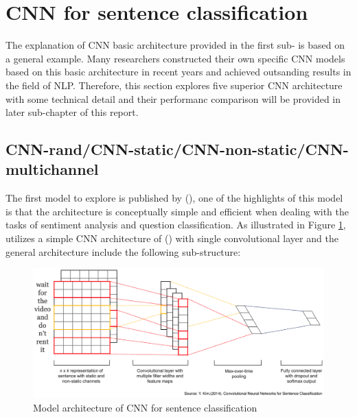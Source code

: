 \documentclass[]{krantz}
\begin{document}
\hypertarget{cnn-for-sentence-classification}{%
\section{CNN for sentence classification}\label{cnn-for-sentence-classification}}

The explanation of CNN basic architecture provided in the first sub-
is based on a general example. Many researchers constructed their own specific CNN models based on this basic architecture in recent years and achieved outsanding results in the field of NLP. Therefore, this section explores five superior CNN architecture with some technical detail and their performanc comparison will be provided in later sub-chapter of this report.

\hypertarget{cnn-randcnn-staticcnn-non-staticcnn-multichannel}{%
\subsection{CNN-rand/CNN-static/CNN-non-static/CNN-multichannel}\label{cnn-randcnn-staticcnn-non-staticcnn-multichannel}}

The first model to explore is published by (\citet{Kim2014ConvolutionalNN}), one of the highlights of this model is that the architecture is conceptually simple and efficient when dealing with the tasks of sentiment analysis and question classification. As illustrated in Figure \ref{fig:figs-7}, \citet{Kim2014ConvolutionalNN} utilizes a simple CNN architecture of (\citet{Collobert2011NaturalLP}) with single convolutional layer and the general architecture include the following sub-structure:

\begin{figure}[ht]

{\centering \includegraphics[width=0.7\linewidth]{figures/01-03-cnns-and-their-applications-in-nlp/CNN_Sentence_Classification} 

}

\caption{Model architecture of CNN for sentence classification}\label{fig:figs-7}
\end{figure}
\end{document}
